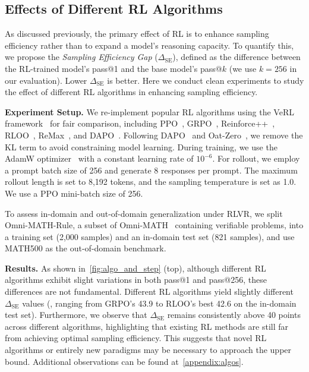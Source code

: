 \subsection{Effects of Different RL Algorithms}
\vspace{-1mm}
\label{sec:algos}

As discussed previously, the primary effect of RL is to enhance sampling efficiency rather than to expand a model's reasoning capacity.  
To quantify this, we propose the \textit{Sampling Efficiency Gap} ($\Delta_{\text{SE}}$), defined as the difference between the RL-trained model's pass@1 and the base model's pass@$k$ (we use $k = 256$ in our evaluation). 
Lower $\Delta_{\text{SE}}$ is better.
Here we conduct clean experiments to study the effect of different RL algorithms in enhancing sampling efficiency.

\textbf{Experiment Setup.}
We re-implement popular RL algorithms using the VeRL framework~\cite{sheng2024verl} for fair comparison, including PPO~\cite{schulman2017ppo}, GRPO~\cite{shao2024deepseekmath}, Reinforce++~\cite{hu2025reinforce++}, RLOO~\cite{ahmadian2024rloo}, ReMax~\cite{li2023remax}, and DAPO~\cite{yu2025dapo}.
Following DAPO~\cite{yu2025dapo} and Oat-Zero~\cite{liu2025oat}, we remove the KL term to avoid constraining model learning. 
During training, we use the AdamW optimizer~\cite{adamw} with a constant learning rate of $10^{-6}$. For rollout, we employ a prompt batch size of 256 and generate 8 responses per prompt. The maximum rollout length is set to 8,192 tokens, and the sampling temperature is set as 1.0. We use a PPO mini-batch size of 256.

To assess in-domain and out-of-domain generalization under RLVR, we split Omni-MATH-Rule, a subset of Omni-MATH~\cite{gao2024omnimathuniversalolympiadlevel} containing verifiable problems, into a training set (2,000 samples) and an in-domain test set (821 samples), and use MATH500 as the out-of-domain benchmark. 

\textbf{Results.}
As shown in~\cref{fig:algo_and_step} (top), although different RL algorithms exhibit slight variations in both pass@1 and pass@256, these differences are not fundamental.  
Different RL algorithms yield slightly different $\Delta_{\text{SE}}$ values (\ie, ranging from GRPO's 43.9 to RLOO's best 42.6 on the in-domain test set).  
Furthermore, we observe that $\Delta_{\text{SE}}$ remains consistently above 40 points across different algorithms, highlighting that existing RL methods are still far from achieving optimal sampling efficiency. This suggests that novel RL algorithms or entirely new paradigms may be necessary to approach the upper bound. Additional observations can be found at~\cref{appendix:algos}.


